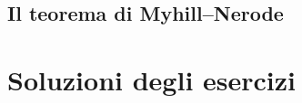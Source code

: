 \subsection{Il teorema di Myhill–Nerode}\label{sec:myhill-nerode}


\newpage
\section*{Soluzioni degli esercizi}
\label{sec:soluzioni-regolari}
\shipoutAnswer

